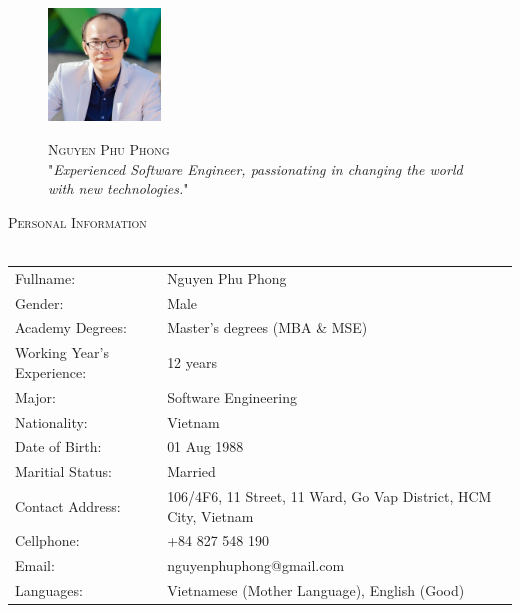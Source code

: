 \documentclass[a4paper]{article}
\newcommand{\lineunder} {
    \vspace*{-8pt} \\
    \hspace*{-18pt} \hrulefill \\
}
\newcommand{\header} [1] {
    {\hspace*{-18pt}\vspace*{6pt} \textsc{#1}}
    \vspace*{-6pt} \lineunder
}
\begin{document}
\vspace*{-40pt}

    

\vspace*{-10pt}
\begin{figure}[htp]
	\begin{minipage}{.3\textwidth}
		\includegraphics[width=3cm, frame=.2em]{Avatar.JPG}
	\end{minipage}
	\begin{minipage}{.7\textwidth}
		\begin{center}
			{\Huge \scshape {Nguyen Phu Phong}}\\
			"\textit{Experienced Software Engineer, passionating in changing the world with new technologies.}" \\
		\end{center}
	\end{minipage}
\end{figure}

\header{Personal Information}
\begin{tabular}{ l l }
	Fullname:                    & Nguyen Phu Phong \\
	Gender:                     & Male \\
	Academy Degrees: 			& Master's degrees (MBA \& MSE) \\
	Working Year's Experience: & 12 years \\
	Major: & Software Engineering \\
	Nationality:               & Vietnam \\
	Date of Birth:                       & 01 Aug 1988 \\
	Maritial Status:                     & Married                                              \\
	Contact Address:                    & 106/4F6, 11 Street, 11 Ward, Go Vap District, HCM City, Vietnam \\
	Cellphone:                         & +84 827 548 190 \\
	Email:			& nguyenphuphong@gmail.com \\
	Languages: & Vietnamese (Mother Language), English (Good)
\end{tabular}
\vspace{2mm}
\end{document}
